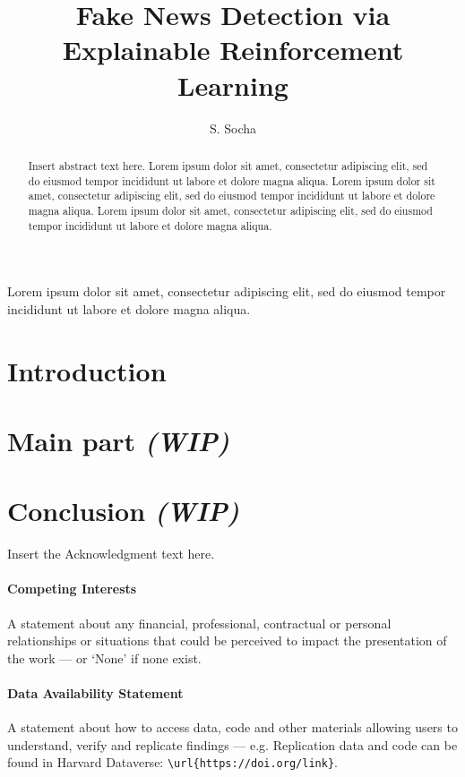 \documentclass[
  journal=largetwo,
  manuscript=article-type,
  year=2020,
  volume=37,
]{cup-journal}
\title{Fake News Detection via Explainable Reinforcement Learning}
\author{S. Socha}
\affiliation{Faculty of Economic Sciences, University of Warsaw, Warsaw, Poland}
\begin{document}
\begin{abstract}
Insert abstract text here. Lorem ipsum dolor sit amet, consectetur adipiscing elit, sed do eiusmod tempor incididunt ut labore et dolore magna aliqua. Lorem ipsum dolor sit amet, consectetur adipiscing elit, sed do eiusmod tempor incididunt ut labore et dolore magna aliqua. Lorem ipsum dolor sit amet, consectetur adipiscing elit, sed do eiusmod tempor incididunt ut labore et dolore magna aliqua. 
\end{abstract}

\noindent Lorem ipsum dolor sit amet, consectetur adipiscing elit, sed do eiusmod tempor incididunt ut labore et dolore magna aliqua. 

\section{Introduction}



\section{Main part \textit{(WIP)}}



\section{Conclusion \textit{(WIP)}}







\begin{acknowledgement}
Insert the Acknowledgment text here.
\end{acknowledgement}

\paragraph{Competing Interests}

A statement about any financial, professional, contractual or personal relationships or situations that could be perceived to impact the presentation of the work --- or `None' if none exist.

\paragraph{Data Availability Statement}

A statement about how to access data, code and other materials allowing users to understand, verify and replicate findings --- e.g. Replication data and code can be found in Harvard Dataverse: \verb+\url{https://doi.org/link}+.



\printendnotes

\printbibliography
\end{document}
